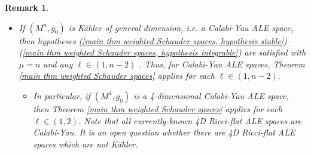 \documentclass[12pt]{amsart}
\renewcommand{\1}{{\mathbf 1}}
\theoremstyle{others}
\newtheorem{rmk}[thm]{Remark}
\numberwithin{equation}{section}
\begin{document}
\begin{rmk}
\begin{itemize}
        


        \vspace{2mm}

        \item If $(M^n, g_0)$ is K{\"a}hler of general dimension, i.e. a Calabi-Yau ALE space, then hypotheses (\ref{main thm weighted Schauder spaces, hypothesis stable})--(\ref{main thm weighted Schauder spaces, hypothesis integrable}) are satisfied with $\mu = n$ and any $\ell \in (1, n-2)$ \cite{DaiWangWei05, DeruelleKroncke20, KronckePetersen22}.
        Thus, for Calabi-Yau ALE spaces, Theorem \ref{main thm weighted Schauder spaces} applies for each $\ell \in (1, n-2).$
        \begin{itemize}
            \item In particular, if $(M^4, g_0)$ is a 4-dimensional Calabi-Yau ALE space, then Theorem \ref{main thm weighted Schauder spaces} applies for each $\ell \in (1, 2)$. 
            Note that all currently-known 4D Ricci-flat ALE spaces are Calabi-Yau.
            It is an open question whether there are 4D Ricci-flat ALE spaces which are not K{\"a}hler.
        \end{itemize}
        
        


\end{itemize}
\end{rmk}
\end{document}
